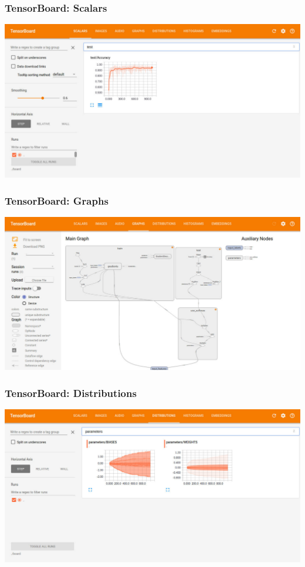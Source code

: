 \begin{frame}
	\MyLogo
	\frametitle{TensorBoard: Scalars}  

\centering\includegraphics[width=0.95\paperwidth]{figures/scalar.pdf} 
	
\end{frame}

%

\begin{frame}
	\MyLogo
	\frametitle{TensorBoard: Graphs}  
	
\centering\includegraphics[width=0.95\paperwidth]{figures/main_graph.pdf} 
	
\end{frame}

%

\begin{frame}
	\MyLogo
	\frametitle{TensorBoard: Distributions}  
	
\centering\includegraphics[width=0.95\paperwidth]{figures/distributions.pdf} 
	
\end{frame}

